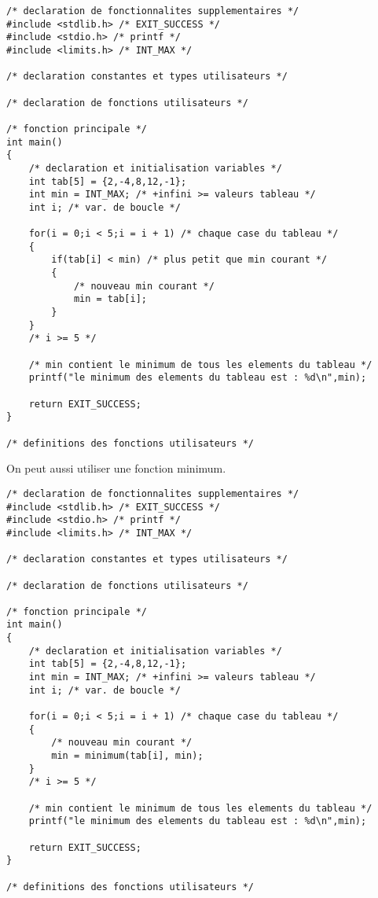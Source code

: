 \begin{correction}
\begin{verbatim}
/* declaration de fonctionnalites supplementaires */
#include <stdlib.h> /* EXIT_SUCCESS */
#include <stdio.h> /* printf */
#include <limits.h> /* INT_MAX */

/* declaration constantes et types utilisateurs */

/* declaration de fonctions utilisateurs */

/* fonction principale */
int main()
{
    /* declaration et initialisation variables */
    int tab[5] = {2,-4,8,12,-1};
    int min = INT_MAX; /* +infini >= valeurs tableau */
    int i; /* var. de boucle */

    for(i = 0;i < 5;i = i + 1) /* chaque case du tableau */
    {
        if(tab[i] < min) /* plus petit que min courant */
        {
            /* nouveau min courant */
            min = tab[i];
        }
    }
    /* i >= 5 */
    
    /* min contient le minimum de tous les elements du tableau */
    printf("le minimum des elements du tableau est : %d\n",min);

    return EXIT_SUCCESS;
}

/* definitions des fonctions utilisateurs */
\end{verbatim}
On peut aussi utiliser une fonction minimum.
\begin{verbatim}
/* declaration de fonctionnalites supplementaires */
#include <stdlib.h> /* EXIT_SUCCESS */
#include <stdio.h> /* printf */
#include <limits.h> /* INT_MAX */

/* declaration constantes et types utilisateurs */

/* declaration de fonctions utilisateurs */

/* fonction principale */
int main()
{
    /* declaration et initialisation variables */
    int tab[5] = {2,-4,8,12,-1};
    int min = INT_MAX; /* +infini >= valeurs tableau */
    int i; /* var. de boucle */

    for(i = 0;i < 5;i = i + 1) /* chaque case du tableau */
    {
        /* nouveau min courant */
        min = minimum(tab[i], min);
    }
    /* i >= 5 */
    
    /* min contient le minimum de tous les elements du tableau */
    printf("le minimum des elements du tableau est : %d\n",min);

    return EXIT_SUCCESS;
}

/* definitions des fonctions utilisateurs */
\end{verbatim}
\end{correction}

